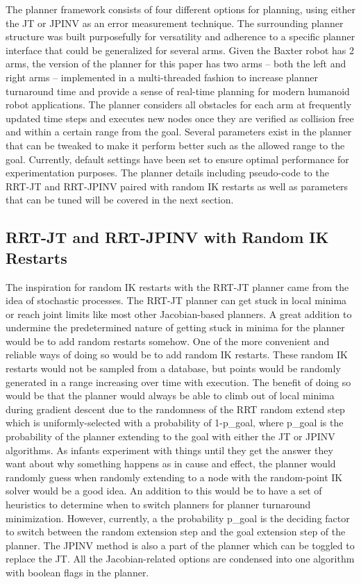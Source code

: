 \documentclass[conference]{IEEEtran} \usepackage[T1]{fontenc} \usepackage[backend=biber, style=ieee]{biblatex}
\begin{document}
The planner framework consists of four different options for planning, using either the JT or JPINV as an error measurement technique. The surrounding planner structure was built
purposefully for versatility and adherence to a specific planner interface that could be generalized for several arms. Given the Baxter robot has 2 arms, the version of
the planner for this paper has two arms -- both the left and right arms -- implemented in a multi-threaded fashion to increase planner turnaround time and provide a 
sense of real-time planning for modern humanoid robot applications. The planner considers all obstacles for each arm at frequently updated time steps and executes new
nodes once they are verified as collision free and within a certain range from the goal. Several parameters exist in the planner that can be tweaked to make it
perform better such as the allowed range to the goal. Currently, default settings have been set to ensure optimal performance for experimentation purposes.
The planner details including pseudo-code to the RRT-JT and RRT-JPINV paired with random IK restarts as well as parameters that can be tuned will be covered in the 
next section.

\subsection{RRT-JT and RRT-JPINV with Random IK Restarts}

The inspiration for random IK restarts with the RRT-JT planner came from the idea of stochastic processes. The RRT-JT planner can get stuck in local minima or reach joint
limits like most other Jacobian-based planners. A great addition to undermine the predetermined nature of getting stuck in minima for the planner would be to add random
restarts somehow. One of the more convenient and reliable ways of doing so would be to add random IK restarts. These random IK restarts would not be sampled from a database,
but points would be randomly generated in a range increasing over time with execution. The benefit of doing so would be that the planner would always be able to climb out of local
minima during gradient descent due to the randomness of the RRT random extend step which is uniformly-selected with a probability of 1-p\_goal, where p\_goal is the probability 
of the planner extending to the goal with either the JT or JPINV algorithms. As infants experiment with things until they get the answer they
want about why something happens as in cause and effect, the planner would randomly guess when randomly extending to a node with the random-point IK solver would be a good idea.
An addition to this would be to have a set of heuristics to determine when to switch planners for planner turnaround minimization. However, currently, a the probability
p\_goal is the deciding factor to switch between the random extension step and the goal extension step of the planner. The JPINV method is also a part of the planner which
can be toggled to replace the JT. All the Jacobian-related options are condensed into one algorithm with boolean flags in the planner.
\end{document}
